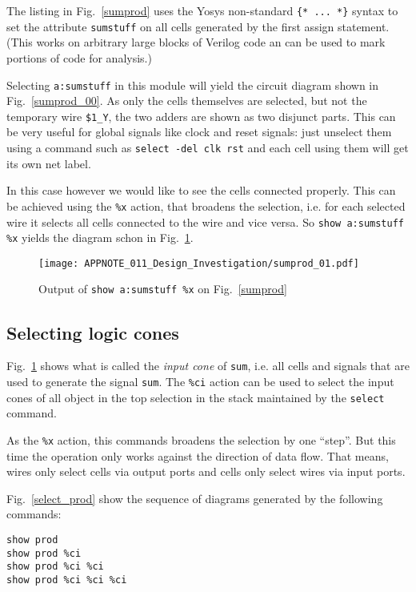 \documentclass[9pt,technote,a4paper]{IEEEtran}
\begin{document}
The listing in Fig.~\ref{sumprod} uses the Yosys non-standard {\tt \{* ... *\}}
syntax to set the attribute {\tt sumstuff} on all cells generated by the first
assign statement. (This works on arbitrary large blocks of Verilog code an
can be used to mark portions of code for analysis.)

Selecting {\tt a:sumstuff} in this module will yield the circuit diagram shown
in Fig.~\ref{sumprod_00}. As only the cells themselves are selected, but not
the temporary wire {\tt \$1\_Y}, the two adders are shown as two disjunct
parts. This can be very useful for global signals like clock and reset signals: just
unselect them using a command such as {\tt select -del clk rst} and each cell
using them will get its own net label.

In this case however we would like to see the cells connected properly. This
can be achieved using the {\tt \%x} action, that broadens the selection, i.e.
for each selected wire it selects all cells connected to the wire and vice
versa. So {\tt show a:sumstuff \%x} yields the diagram schon in Fig.~\ref{sumprod_01}.

\begin{figure}[t]
\texttt{[image: APPNOTE\_011\_Design\_Investigation/sumprod\_01.pdf]}
\caption{Output of {\tt show a:sumstuff \%x} on Fig.~\ref{sumprod}}
\label{sumprod_01}
\end{figure}

\subsection{Selecting logic cones}

Fig.~\ref{sumprod_01} shows what is called the {\it input cone\/} of {\tt sum}, i.e.
all cells and signals that are used to generate the signal {\tt sum}. The {\tt \%ci}
action can be used to select the input cones of all object in the top selection
in the stack maintained by the {\tt select} command.

As the {\tt \%x} action, this commands broadens the selection by one ``step''. But
this time the operation only works against the direction of data flow. That means,
wires only select cells via output ports and cells only select wires via input ports.

Fig.~\ref{select_prod} show the sequence of diagrams generated by the following
commands:

\begin{verbatim}
show prod
show prod %ci
show prod %ci %ci
show prod %ci %ci %ci
\end{verbatim}
\end{document}
